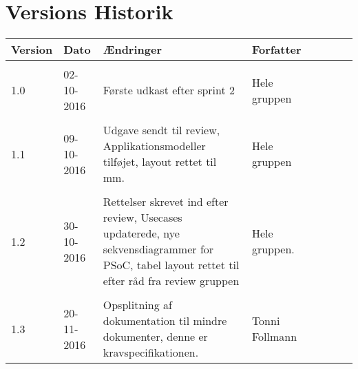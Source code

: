 \chapter{Versions Historik}

\begin{tabularx}{365pt}{ TX  TX  TX  TX }
\textbf{Version} & \textbf{Dato} & \textbf{Ændringer} & \textbf{Forfatter}\\\hline\\
1.0 & 02-10-2016 & Første udkast efter sprint 2 & Hele gruppen \\
\hline\\
1.1 & 09-10-2016 & Udgave sendt til review, Applikationsmodeller tilføjet, layout rettet til mm. & Hele gruppen \\
\hline\\
1.2 & 30-10-2016 & Rettelser skrevet ind efter review, Usecases updaterede, nye sekvensdiagrammer for PSoC, tabel layout rettet til efter råd fra review gruppen & Hele gruppen.
\\
\hline\\
1.3 & 20-11-2016 & Opsplitning af dokumentation til mindre dokumenter, denne er kravspecifikationen. & Tonni Follmann \\
\end{tabularx}
\pagebreak